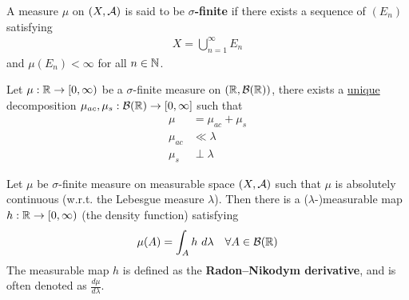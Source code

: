 \documentclass[11pt]{article}
\newcommand{\s}[0]{$\sigma$}
\begin{document}
	\begin{definition}
	    A measure $\mu$ on $(X, \mathcal{{A}})$ is said to be \textbf{\s-finite} if there exists a sequence of $(E_n)$ satisfying
	    \begin{align}
	        X = \bigcup_{n=1}^\infty E_n
	    \end{align}
	    and $\mu(E_n) < \infty$ for all $n \in \mathbb{N}$.
	\end{definition}

    \begin{theorem}
        Let $\mu: \mathbb{R} \to [0, \infty)$ be a \s-finite measure on $(\mathbb{R}, \mathcal{{B}}(\mathbb{R}))$, there exists a \ul{unique} decomposition $\mu_{ac}, \mu_s: \mathcal{{B}}(\mathbb{R}) \to [0, \infty]$ such that
        \begin{align}
            \mu &= \mu_{ac} + \mu_s \\
            \mu_{ac} &\ll \lambda \\
            \mu_s &\perp \lambda
        \end{align}
    \end{theorem}
    
    \begin{theorem}
        Let $\mu$ be \s-finite measure on measurable space $(X, \mathcal{{A}})$ such that $\mu$ is absolutely continuous (w.r.t. the Lebesgue measure $\lambda$).
        Then there is a ($\lambda$-)measurable map $h: \mathbb{R} \to [0, \infty)$ (the density function) satisfying
        \begin{align}
            \mu (A) = \int_A h\ d\lambda\quad \forall A \in \mathcal{{B}}(\mathbb{R})
        \end{align}
        The measurable map $h$ is defined as the \textbf{Radon–Nikodym derivative}, and is often denoted as $\frac{d \mu}{d \lambda}$.
    \end{theorem}
\end{document}
